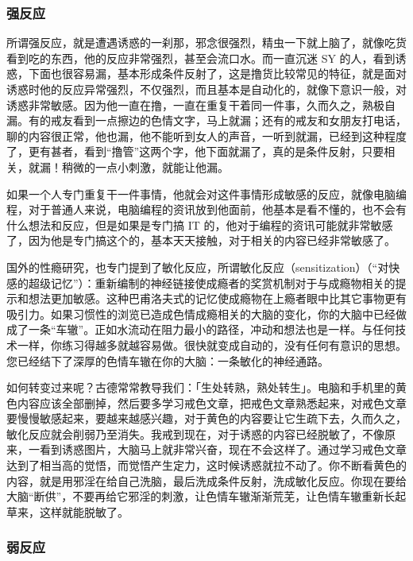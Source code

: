 \subsubsection{强反应}

所谓强反应，就是遭遇诱惑的一刹那，邪念很强烈，精虫一下就上脑了，就像吃货看到吃的东西，他的反应非常强烈，甚至会流口水。而一直沉迷 SY 的人，看到诱惑，下面也很容易漏，基本形成条件反射了，这是撸货比较常见的特征，就是面对诱惑时他的反应异常强烈，不仅强烈，而且基本是自动化的，就像下意识一般，对诱惑非常敏感。因为他一直在撸，一直在重复干着同一件事，久而久之，熟极自漏。有的戒友看到一点擦边的色情文字，马上就漏；还有的戒友和女朋友打电话，聊的内容很正常，他也漏，他不能听到女人的声音，一听到就漏，已经到这种程度了，更有甚者，看到“撸管”这两个字，他下面就漏了，真的是条件反射，只要相关，就漏！稍微的一点小刺激，就能让他漏。

如果一个人专门重复干一件事情，他就会对这件事情形成敏感的反应，就像电脑编程，对于普通人来说，电脑编程的资讯放到他面前，他基本是看不懂的，也不会有什么想法和反应，但是如果是专门搞 IT 的，他对于编程的资讯可能就非常敏感了，因为他是专门搞这个的，基本天天接触，对于相关的内容已经非常敏感了。

国外的性瘾研究，也专门提到了敏化反应，所谓敏化反应（sensitization）（“对快感的超级记忆”）：重新编制的神经链接使成瘾者的奖赏机制对于与成瘾物相关的提示和想法更加敏感。这种巴甫洛夫式的记忆使成瘾物在上瘾者眼中比其它事物更有吸引力。如果习惯性的浏览已造成色情成瘾相关的大脑的变化，你的大脑中已经做成了一条“车辙”。正如水流动在阻力最小的路径，冲动和想法也是一样。与任何技术一样，你练习得越多就越容易做。很快就变成自动的，没有任何有意识的思想。您已经结下了深厚的色情车辙在你的大脑：一条敏化的神经通路。

如何转变过来呢？古德常常教导我们：「生处转熟，熟处转生」。电脑和手机里的黄色内容应该全部删掉，然后要多学习戒色文章，把戒色文章熟悉起来，对戒色文章要慢慢敏感起来，要越来越感兴趣，对于黄色的内容要让它生疏下去，久而久之，敏化反应就会削弱乃至消失。我戒到现在，对于诱惑的内容已经脱敏了，不像原来，一看到诱惑图片，大脑马上就非常兴奋，现在不会这样了。通过学习戒色文章达到了相当高的觉悟，而觉悟产生定力，这时候诱惑就拉不动了。你不断看黄色的内容，就是用邪淫在给自己洗脑，最后洗成条件反射，洗成敏化反应。你现在要给大脑“断供”，不要再给它邪淫的刺激，让色情车辙渐渐荒芜，让色情车辙重新长起草来，这样就能脱敏了。

\subsubsection{弱反应}

